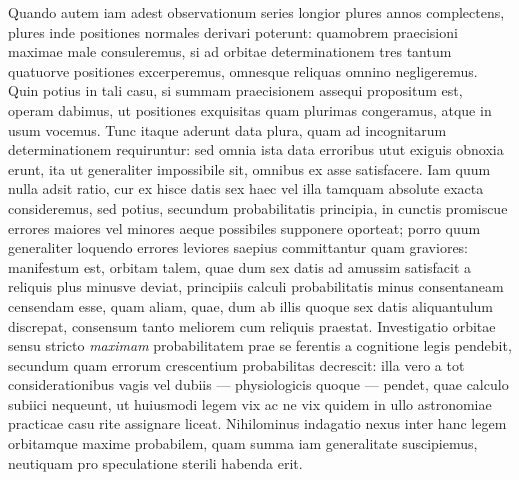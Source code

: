 Quando autem iam adest observationum series longior plures annos complectens,
plures inde positiones normales derivari poterunt: quamobrem praecisioni
maximae male consuleremus, si ad orbitae determinationem tres tantum
quatuorve positiones excerperemus, omnesque reliquas omnino negligeremus.
Quin potius in tali casu, si summam praecisionem assequi propositum est,
operam dabimus, ut positiones exquisitas quam plurimas congeramus, atque in
usum vocemus. Tunc itaque aderunt data plura, quam ad incognitarum
determinationem requiruntur: sed omnia ista data erroribus utut exiguis
obnoxia erunt, ita ut generaliter impossibile sit, omnibus ex asse satisfacere.
Iam quum nulla adsit ratio, cur ex hisce datis sex haec vel illa tamquam
absolute exacta consideremus, sed potius, secundum probabilitatis principia,
in cunctis promiscue errores maiores vel minores aeque possibiles
supponere oporteat; porro quum generaliter loquendo errores leviores saepius
committantur quam graviores: manifestum est, orbitam talem, quae dum sex
datis ad amussim satisfacit a reliquis plus minusve deviat, principiis calculi
probabilitatis minus consentaneam censendam esse, quam aliam, quae, dum ab
illis quoque sex datis aliquantulum discrepat, consensum tanto meliorem cum
reliquis praestat. Investigatio orbitae sensu stricto \emph{maximam} probabilitatem
prae se ferentis a cognitione legis pendebit, secundum quam errorum
crescentium probabilitas decrescit: illa vero a tot considerationibus vagis vel
dubiis --- physiologicis quoque --- pendet, quae calculo subiici nequeunt, ut
huiusmodi legem vix ac ne vix quidem in ullo astronomiae practicae casu rite
assignare liceat. Nihilominus indagatio nexus inter hanc legem orbitamque
maxime probabilem, quam summa iam generalitate suscipiemus, neutiquam pro
speculatione sterili habenda erit.
